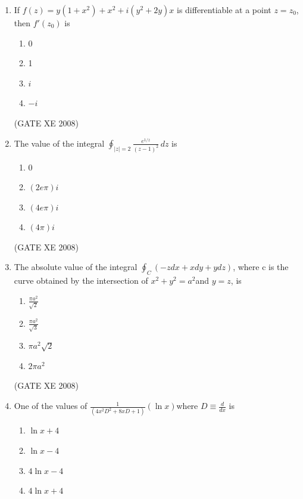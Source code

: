 \documentclass[12pt]{article}
\begin{document}
\begin{enumerate}
\begin{enumerate}
\item $\frac{2\pi}{3} (\sqrt{2} +1)$
\item $\frac{2\pi}{3} (\sqrt{2} -1)$
\item $\frac{\pi}{2} (\sqrt{3})$
\item $\frac{-\pi}{2} (\sqrt{3})$
\end{enumerate}

(GATE XE 2008)
\item If $f(z)=y(1+x^2) +x^2 +i(y^2+2y)x$ is differentiable at a point $z=z_0$, then $f'(z_0)$ is

\begin{enumerate}
\item 0
\item 1
\item $i$
\item $-i$
\end{enumerate}

(GATE XE 2008)

\item  The value of the integral $\oint_{|z|=2} \frac{e^{1/z}}{(z-1)^2} \,dz$ is

\begin{enumerate}
\item 0
\item $(2e\pi)i$
 \item $(4e\pi)i$
\item $(4\pi)i$
\end{enumerate}

(GATE XE 2008)
\item  The absolute value of the integral $\oint_C(-zdx+xdy+ydz)$, where c is the curve obtained by the intersection of $x^2 + y^2 = a^2$and $y=z$, is

\begin{enumerate}
\item  $\frac{\pi a^2}{\sqrt{2}}$
\item $\frac{\pi a^2}{\sqrt{3}}$
\item $\pi a^2 \sqrt{2}$
\item $2\pi a^2$
\end{enumerate}

(GATE XE 2008)
\item  One of the values of  $\frac{1}{(4x^2D^2 + 8xD+1)}(\ln{x})$where $D\equiv \frac{d}{dx}$ is

\begin{enumerate}
\item  $\ln{x} +4$
\item $\ln{x} -4$
\item $4\ln{x} -4$
\item $4\ln{x} +4$
\end{enumerate}


\end{enumerate}
\end{document}
